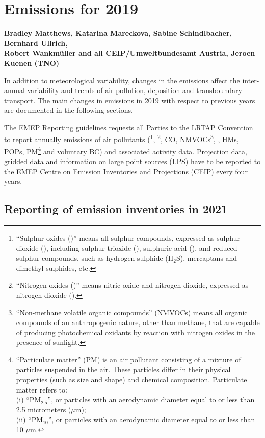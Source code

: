 \chapter[Emissions 2019]{Emissions for 2019}
\label{ch:emis2019}


{\bf{Bradley Matthews, Katarina Mareckova, Sabine Schindlbacher, Bernhard Ullrich, \\
Robert Wankm\"uller and all CEIP/Umweltbundesamt Austria, Jeroen Kuenen (TNO)}}
\vspace{30pt}

In addition to meteorological variability, changes in the emissions
affect the inter-annual variability and trends of air pollution,
deposition and transboundary transport.  
The main changes in emissions in 2019 with respect to previous years
are documented in the following sections.


The EMEP Reporting guidelines \citep{UNECE2014} requests all Parties
to the LRTAP Convention to report annually emissions of air pollutants
(\sox\footnote{``Sulphur oxides (\sox)'' means all sulphur compounds,
  expressed as sulphur dioxide (\soii), including sulphur trioxide
  (\soiii), sulphuric acid (\sulacid), and reduced sulphur compounds,
  such as hydrogen sulphide (H${_2}$S), mercaptans and dimethyl
  sulphides, etc.}, \noii\footnote{``Nitrogen oxides (\nox)'' means
  nitric oxide and nitrogen dioxide, expressed as nitrogen dioxide
  (\noii).}, CO, NMVOCs\footnote{``Non-methane volatile organic
  compounds'' (NMVOCs) means all organic compounds of an anthropogenic
  nature, other than methane, that are capable of producing
  photochemical oxidants by reaction with nitrogen oxides in the
  presence of sunlight.}, \nhiii, HMs, POPs,
PM\footnote{``Particulate matter'' (PM) is an air pollutant
  consisting of a mixture of particles suspended in the air. These
  particles differ in their physical properties (such as size and
  shape) and chemical composition. Particulate matter refers to:\\  
(i) ``PM$_{2.5}$'', or particles with an aerodynamic diameter equal to or
  less than 2.5 micrometers ($\mu$m);\\ 
(ii) ``PM$_{10}$'', or particles with an aerodynamic diameter equal to or
  less than 10 $\mu$m.} and voluntary BC) and associated activity data. Projection data, gridded data and information on large point sources (LPS) 
have to be reported to the EMEP Centre on Emission Inventories and Projections (CEIP) every four years.

\section{Reporting of emission inventories in 2021}

